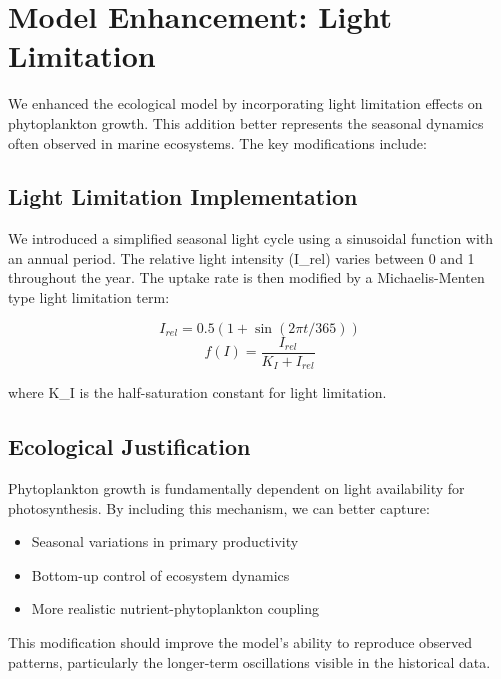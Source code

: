 \section{Model Enhancement: Light Limitation}

We enhanced the ecological model by incorporating light limitation effects on phytoplankton growth. This addition better represents the seasonal dynamics often observed in marine ecosystems. The key modifications include:

\subsection{Light Limitation Implementation}
We introduced a simplified seasonal light cycle using a sinusoidal function with an annual period. The relative light intensity (I\_rel) varies between 0 and 1 throughout the year. The uptake rate is then modified by a Michaelis-Menten type light limitation term:

\[ I_{rel} = 0.5(1 + \sin(2\pi t/365)) \]
\[ f(I) = \frac{I_{rel}}{K_I + I_{rel}} \]

where K\_I is the half-saturation constant for light limitation.

\subsection{Ecological Justification}
Phytoplankton growth is fundamentally dependent on light availability for photosynthesis. By including this mechanism, we can better capture:
\begin{itemize}
    \item Seasonal variations in primary productivity
    \item Bottom-up control of ecosystem dynamics
    \item More realistic nutrient-phytoplankton coupling
\end{itemize}

This modification should improve the model's ability to reproduce observed patterns, particularly the longer-term oscillations visible in the historical data.
